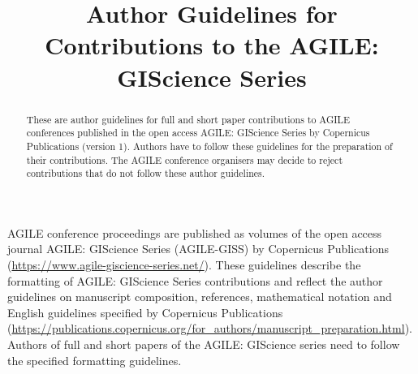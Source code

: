 \documentclass[agile, final]{copernicus-agile}
\begin{document}
\title{Author Guidelines for Contributions to the AGILE: GIScience Series}









\maketitle

\begin{abstract}
These are author guidelines for full and short paper contributions to AGILE conferences published in the open access AGILE: GIScience Series by Copernicus Publications (version 1). Authors have to follow these guidelines for the preparation of their contributions. The AGILE conference organisers may decide to reject contributions that do not follow these author guidelines.
\end{abstract}


\label{intro}
AGILE conference proceedings are published as volumes of the open access journal AGILE: GIScience Series (AGILE-GISS) by Copernicus Publications (\url{https://www.agile-giscience-series.net/}). These guidelines describe the formatting of AGILE: GIScience Series contributions and reflect the author guidelines on manuscript composition, references, mathematical notation and English guidelines specified by Copernicus Publications (\url{https://publications.copernicus.org/for_authors/manuscript_preparation.html}). Authors of full and short papers of the AGILE: GIScience series need to follow the specified formatting guidelines.
\end{document}
